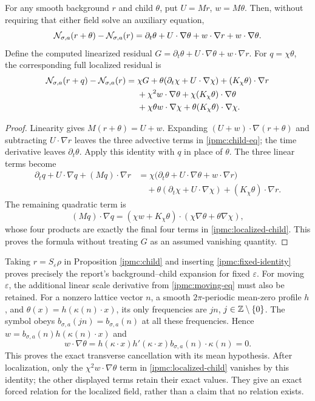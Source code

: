 \begin{proposition}\label{ipmc:child}
For any smooth background $r$ and child $\theta$, put $U=Mr$, $w=M\theta$.
Then, without requiring that either field solve an auxiliary equation,
\begin{equation}\label{ipmc:child-eq}
\mathcal N_{\sigma,a}(r+\theta)-\mathcal N_{\sigma,a}(r)
=\partial_t\theta+U\cdot\nabla\theta
+w\cdot\nabla r+w\cdot\nabla\theta.
\end{equation}
Define the computed linearized residual
$G=\partial_t\theta+U\cdot\nabla\theta+w\cdot\nabla r$.
For $q=\chi\theta$, the corresponding full localized residual is
\begin{align}\label{ipmc:localized-child}
\mathcal N_{\sigma,a}(r+q)-\mathcal N_{\sigma,a}(r)
={}&\chi G+\theta(\partial_t\chi+U\cdot\nabla\chi)
+(K_\chi\theta)\cdot\nabla r\\
&+\chi^2w\cdot\nabla\theta
+\chi(K_\chi\theta)\cdot\nabla\theta\notag\\
&+\chi\theta w\cdot\nabla\chi
+\theta(K_\chi\theta)\cdot\nabla\chi.\notag
\end{align}
\end{proposition}
\begin{proof}
Linearity gives $M(r+\theta)=U+w$. Expanding
$(U+w)\cdot\nabla(r+\theta)$ and subtracting $U\cdot\nabla r$
leaves the three advective terms in \eqref{ipmc:child-eq}; the time derivative
leaves $\partial_t\theta$. Apply this identity with $q$ in place of $\theta$.
The three linear terms become
\begin{align*}
\partial_tq+U\cdot\nabla q+(Mq)\cdot\nabla r
&=\chi\bigl(\partial_t\theta+U\cdot\nabla\theta
+w\cdot\nabla r\bigr)\\
&\quad+\theta(\partial_t\chi+U\cdot\nabla\chi)
+(K_\chi\theta)\cdot\nabla r.
\end{align*}
The remaining quadratic term is
\[
(Mq)\cdot\nabla q
=(\chi w+K_\chi\theta)\cdot(\chi\nabla\theta+\theta\nabla\chi),
\]
whose four products are exactly the final four terms in
\eqref{ipmc:localized-child}. This proves the formula without treating $G$
as an assumed vanishing quantity.
\end{proof}

Taking $r=S_\varepsilon\rho$ in Proposition \ref{ipmc:child} and inserting
\eqref{ipmc:fixed-identity} proves precisely the report's background--child
expansion for fixed $\varepsilon$. For moving $\varepsilon$, the additional
linear scale derivative from \eqref{ipmc:moving-eq} must also be retained.
For a nonzero lattice vector $n$, a smooth $2\pi$-periodic mean-zero profile
$h$, and $\theta(x)=h(\kappa(n)\cdot x)$, its only frequencies are $jn$,
$j\in\mathbb Z\setminus\{0\}$. The symbol obeys
$b_{\sigma,a}(jn)=b_{\sigma,a}(n)$ at all these frequencies. Hence
$w=b_{\sigma,a}(n)h(\kappa(n)\cdot x)$ and
\[
w\cdot\nabla\theta
=h(\kappa\cdot x)h'(\kappa\cdot x)
b_{\sigma,a}(n)\cdot\kappa(n)=0.
\]
This proves the exact transverse cancellation with its mean hypothesis.
After localization, only the $\chi^2w\cdot\nabla\theta$ term in
\eqref{ipmc:localized-child} vanishes by this identity; the other displayed
terms retain their exact values. They give an exact forced relation for the
localized field, rather than a claim that no relation exists.

